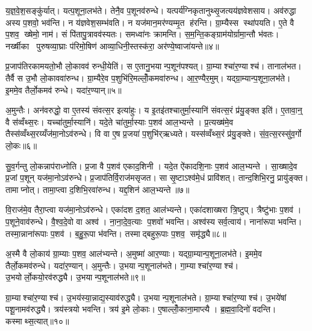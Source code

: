 य॒ज्ञ॒वे॒श॒सङ्कु॑र्यात्। यत्प॒शूना॒लभ॑ते। तेनै॒व प॒शूनव॑रुन्धे। यत्पर्य॑ग्निकृतानुथ्सृ॒जत्यय॑ज्ञवेशसाय। अव॑रुद्धा अस्य प॒शवो॒ भव॑न्ति। न य॑ज्ञवेश॒सम्भ॑वति। न यज॑मान॒मर॑ण्यम्मृ॒त ह॑रन्ति। ग्रा॒म्यैस्स स्था॑पयति। ए॒ते वै प॒शव॒ ख्षेमो॒ नाम॑। सं पि॑तापु॒त्रावव॑स्यतः। समध्वा॑नः क्रामन्ति। स॒म॒न्ति॒कङ्ग्राम॑योर्ग्रामा॒न्तौ भ॑वतः। नर्ख्षीका पुरुषव्या॒घ्राः प॑रिमो॒षिण॑ आव्या॒धिनी॒स्तस्क॑रा॒ अर॑ण्ये॒ष्वाजा॑यन्ते॥४॥\anuvakamend[ऋ॒तव॑ स्यातामुथ्सृ॒जेथ्स्य॑त॒स्त्रीणि॑ च]

प्र॒जाप॑तिरकामयतो॒भौ लो॒कावव॑ रुन्धी॒येति॑। स ए॒तानु॒भयान्प॒शून॑पश्यत्। ग्रा॒म्याश्चा॑र॒ण्याश्च॑। तानाल॑भत। तैर्वै स उ॒भौ लो॒काववा॑रुन्ध। ग्रा॒म्यैरे॒व प॒शुभि॑रि॒मल्लोँ॒कमवा॑रुन्ध। आ॒र॒ण्यैर॒मुम्। यद्ग्रा॒म्यान्प॒शूना॒लभ॑ते। इ॒ममे॒व तैर्लो॒कमव॑ रुन्धे। यदा॑र॒ण्यान्॥५॥

अ॒मुन्तैः। अन॑वरुद्धो॒ वा ए॒तस्य॑ संवत्स॒र इत्या॑हुः। य इ॒तइ॑तश्चातुर्मा॒स्यानि॑ संवत्स॒रं प्र॑यु॒ङ्क्त इति॑। ए॒तावा॒न्॒ वै स॑व्वँथ्स॒रः। यच्चा॑तुर्मा॒स्यानि॑। यदे॒ते चा॑तुर्मा॒स्याः प॒शव॑ आल॒भ्यन्ते। प्र॒त्यख्ष॑मे॒व तैस्स॑व्वँथ्स॒रय्यँज॑मा॒नोऽव॑रुन्धे। वि वा ए॒ष प्र॒जया॑ प॒शुभि॑र्‌ऋध्यते। यस्स॑व्वँथ्स॒रं प्र॑यु॒ङ्क्ते। सं॒व॒त्स॒रस्सु॑व॒र्गो लो॒कः॥६॥

सु॒व॒र्गन्तु लो॒कन्नाप॑राध्नोति। प्र॒जा वै प॒शव॑ एकाद॒शिनी। यदे॒त ऐ॑कादशि॒नाः प॒शव॑ आल॒भ्यन्ते। सा॒ख्षादे॒व प्र॒जां प॒शून् यज॑मा॒नोऽव॑रुन्धे। प्र॒जाप॑तिर्वि॒राज॑मसृजत। सा सृ॒ष्टाऽश्व॑मे॒धं प्रावि॑शत्। तान्द॒शिभि॒रनु॒ प्रायु॑ङ्क्त। तामाप्नोत्। तामा॒प्त्वा द॒शिभि॒रवा॑रुन्ध। यद्द॒शिन॑ आल॒भ्यन्ते॥७॥

वि॒राज॑मे॒व तैरा॒प्त्वा यज॑मा॒नोऽव॑रुन्धे। एका॑दश द॒शत॒ आल॑भ्यन्ते। एका॑दशाख्षरा त्रि॒ष्टुप्। त्रैष्टु॑भाः प॒शव॑। प॒शूने॒वाव॑रुन्धे। वै॒श्व॒दे॒वो वा अश्व॑। ना॒ना॒दे॒व॒त्याः प॒शवो॑ भवन्ति। अश्व॑स्य सर्व॒त्वाय॑। नाना॑रूपा भवन्ति। तस्मा॒न्नाना॑रूपाः प॒शव॑। ब॒हु॒रू॒पा भ॑वन्ति। तस्माद्बहुरू॒पाः प॒शव॒ समृ॑द्ध्यै॥८॥\anuvakamend[आ॒र॒ण्याल्लोँ॒को द॒शिन॑ आल॒भ्यन्ते॒ नाना॑रूपाः प॒शवो॒ द्वे च॑]

अ॒स्मै वै लो॒काय॑ ग्रा॒म्याः प॒शव॒ आल॑भ्यन्ते। अ॒मुष्मा॑ आर॒ण्याः। यद्ग्रा॒म्यान्प॒शूना॒लभ॑ते। इ॒ममे॒व तैर्लो॒कमव॑रुन्धे। यदा॑र॒ण्यान्। अ॒मुन्तैः। उ॒भयान्प॒शूनाल॑भते। गा॒म्याश्चा॑र॒ण्याश्च॑। उ॒भयोर्लो॒कयो॒रव॑रुद्ध्यै। उ॒भयान्प॒शूनाल॑भते॥९॥

ग्रा॒म्याश्चा॑र॒ण्याश्च॑। उ॒भय॑स्या॒न्नाद्य॒स्याव॑रुद्ध्यै। उ॒भयान्प॒शूनाल॑भते। ग्रा॒म्याश्चा॑र॒ण्याश्च॑। उ॒भये॑षां पशू॒नामव॑रुद्ध्यै। त्रय॑स्त्रयो भवन्ति। त्रय॑ इ॒मे लो॒काः। ए॒षाल्लोँ॒काना॒माप्त्यै। ब्र॒ह्म॒वा॒दिनो॑ वदन्ति। कस्माथ्स॒त्यात्॥१०॥

